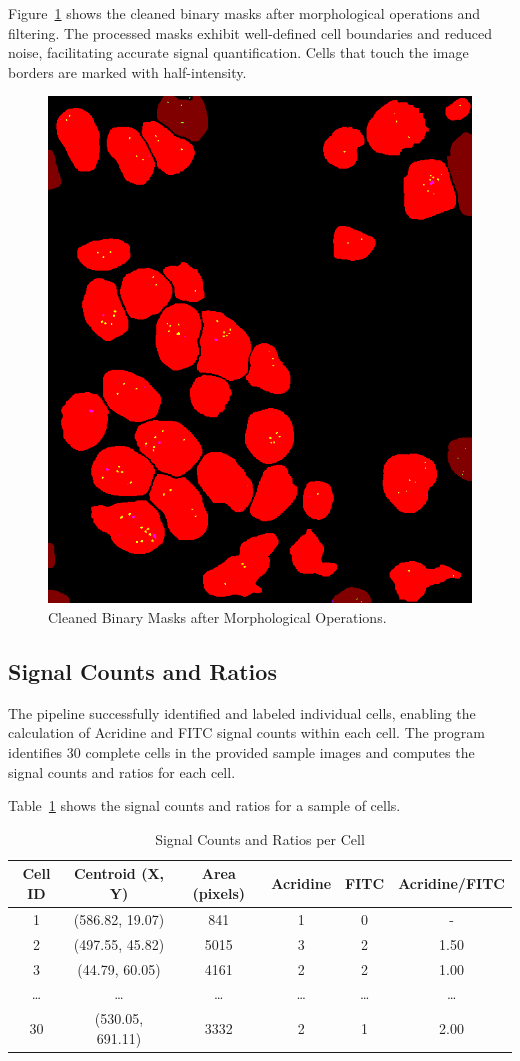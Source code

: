 \documentclass[a4paper,12pt]{article}
\begin{document}
Figure~\ref{fig:cell_binary_masks_cleaned} shows the cleaned binary masks after morphological operations and filtering. The processed masks exhibit well-defined cell boundaries and reduced noise, facilitating accurate signal quantification. Cells that touch the image borders are marked with half-intensity.

\begin{figure}[h]
    \centering
    \includegraphics[width=0.5\linewidth]{data/output/fish_signal_counts/binary_masks_cleaned.png}
    \caption{Cleaned Binary Masks after Morphological Operations.}
    \label{fig:cell_binary_masks_cleaned}
\end{figure}

\subsection{Signal Counts and Ratios}

The pipeline successfully identified and labeled individual cells, enabling the calculation of Acridine and FITC signal counts within each cell. The program identifies 30 complete cells in the provided sample images and computes the signal counts and ratios for each cell.

Table~\ref{tab:results} shows the signal counts and ratios for a sample of cells.

\begin{table}[h]
    \centering
    \caption{Signal Counts and Ratios per Cell}
    \label{tab:results}
    \begin{tabular}{|c|c|c|c|c|c|}
        \hline
        \textbf{Cell ID} & \textbf{Centroid (X, Y)} & \textbf{Area (pixels)} & \textbf{Acridine} & \textbf{FITC} & \textbf{Acridine/FITC} \\
        \hline
        1 & (586.82, 19.07) & 841 & 1 & 0 & - \\
        2 & (497.55, 45.82) & 5015 & 3 & 2 & 1.50 \\
        3 & (44.79, 60.05) & 4161 & 2 & 2 & 1.00 \\
        \ldots & \ldots & \ldots & \ldots & \ldots & \ldots \\
        30 & (530.05, 691.11) & 3332 & 2 & 1 & 2.00 \\
        \hline
    \end{tabular}
\end{table}
\end{document}
